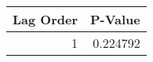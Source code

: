 \begin{tabular}{rr}
\toprule
 Lag Order &  P-Value \\
\midrule
         1 & 0.224792 \\
\bottomrule
\end{tabular}
